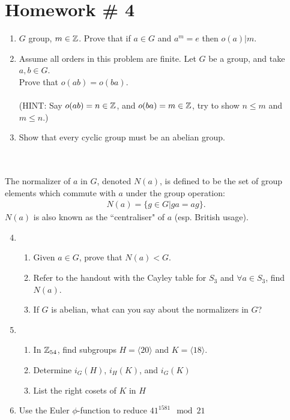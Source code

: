 \section*{Homework \# 4}
\begin{enumerate}
    \item $G$ group, $m\in {\mathbb{ Z}}$. Prove that if $a\in G$ and $a^m=e$ then $o(a)|m$.
    \item Assume all orders in this problem are finite. Let $G$ be a group, and take $a,b\in G$. \\Prove that $o(ab)=o(ba)$.\\ \\
    (HINT: Say $o(ab)=n\in {\mathbb{ Z}}$, and $o(ba)=m\in {\mathbb{ Z}}$, try to show $n\leq m$ and $m\leq n$.)
    \item Show that every cyclic group must be an abelian group. \\ \\ 
\end{enumerate}
    
\begin{definition}\hspace{0.1in} \\
The normalizer of $a$ in $G$, denoted $N(a)$, is defined to be the set of group elements which commute with $a$ under the group operation:
\begin{align}
    N(a)=\{g\in G| ga=ag\}. \nonumber
\end{align}
$N(a)$ is also known as the ``centraliser" of $a$ (esp. British usage).
\end{definition}

\begin{enumerate}
\setcounter{enumi}{3}
    \item \begin{enumerate}[label=\alph*)]
        \item Given $a\in G$, prove that $N(a)<G$.
        \item Refer to the handout with the Cayley table for $S_3$ and $\forall a \in S_3$, find $N(a)$.
        \item If $G$ is abelian, what can you say about the normalizers in $G$?
    \end{enumerate}
    \item \begin{enumerate}[label=\alph*)]
        \item In ${\mathbb{ Z}}_{54}$, find subgroups $H=\langle 20 \rangle$ and $K= \langle 18 \rangle$.
        \item Determine $i_G(H)$, $i_H(K)$, and $i_G(K)$
        \item List the right cosets of $K$ in $H$
    \end{enumerate}
    \item Use the Euler $\phi$-function to reduce $41^{1581}\mod 21$
\end{enumerate}
\newpage
